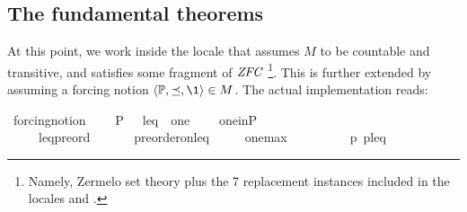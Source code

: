 
\subsection{The fundamental theorems}\label{sec:fundamental-theorems}
At this point, we work inside the locale  that
assumes $M$ to be
countable and transitive, and satisfies some fragment of
$\mathit{ZFC}$%
\footnote{%
Namely, Zermelo set theory plus the 7 replacement instances included in
the locales  and .
}.
This is further extended by assuming a forcing notion
$\lb \PP, {\preceq} ,\1\rb \in M$. The actual implementation reads:

\begin{isabelle}
\isamarkupfalse%
\ forcing{\isacharunderscore}{\kern0pt}notion\ {\isacharequal}{\kern0pt}\isanewline
\ \ \ P\ {\isacharparenleft}{\kern0pt}{\isacartoucheopen}{\isasymbbbP}{\isacartoucheclose}{\isacharparenright}{\kern0pt}\ \ leq\ \ one\ {\isacharparenleft}{\kern0pt}{\isacartoucheopen}{\isasymone}{\isacartoucheclose}{\isacharparenright}{\kern0pt}\isanewline
\ \ \ one{\isacharunderscore}{\kern0pt}in{\isacharunderscore}{\kern0pt}P{\isacharcolon}{\kern0pt}\ \ \ \ \ \ \ {\isachardoublequoteopen}{\isasymone}\ {\isasymin}\ {\isasymbbbP}{\isachardoublequoteclose}\isanewline
\ \ \ \ \ leq{\isacharunderscore}{\kern0pt}preord{\isacharcolon}{\kern0pt}\ \ \ \ \ \ \ {\isachardoublequoteopen}preorder{\isacharunderscore}{\kern0pt}on{\isacharparenleft}{\kern0pt}{\isasymbbbP}{\isacharcomma}{\kern0pt}leq{\isacharparenright}{\kern0pt}{\isachardoublequoteclose}\isanewline
\ \ \ \ \ one{\isacharunderscore}{\kern0pt}max{\isacharcolon}{\kern0pt}\ \ \ \ \ \ \ \ \ \ {\isachardoublequoteopen}{\isasymforall}p{\isasymin}{\isasymbbbP}{\isachardot}{\kern0pt}\ {\isasymlangle}p{\isacharcomma}{\kern0pt}{\isasymone}{\isasymrangle}{\isasymin}leq{\isachardoublequoteclose}
\end{isabelle}

